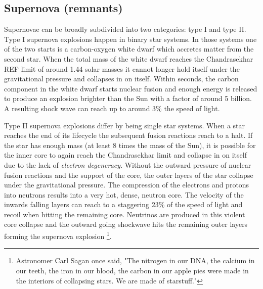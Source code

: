 \subsection{Supernova (remnants)}
Supernovae can be broadly subdivided into two categories: type I and type II. Type I supernova explosions happen in binary star systems. In those systems one of the two starts is a carbon-oxygen white dwarf which accretes matter from the second star. When the total mass of the white dwarf reaches the Chandrasekhar REF limit of around 1.44 solar masses it cannot longer hold itself under the gravitational pressure and collapses in on itself. Within seconds, the carbon component in the white dwarf starts nuclear fusion and enough energy is released to produce an explosion brighter than the Sun with a factor of around 5 billion. 
A resulting shock wave can reach up to around 3\% the speed of light.

Type II supernova explosions differ by being single star systems. When a star reaches the end of its lifecycle the subsequent fusion reactions reach to a halt. If the star has enough mass (at least 8 times the mass of the Sun), it is possible for the inner core to again reach the Chandrasekhar limit and collapse in on itself due to the lack of \textit{electron degeneracy}. Without the outward pressure of nuclear fusion reactions and the support of the core, the outer layers of the star collapse under the gravitational pressure. The compression of the electrons and protons into neutrons results into a very hot, dense, neutron core. The velocity of the inwards falling layers can reach to a staggering 23\% of the speed of light and recoil when hitting the remaining core. Neutrinos are produced in this violent core collapse and the outward going shockwave hits the remaining outer layers forming the supernova explosion \footnote{Astronomer Carl Sagan once said, "The nitrogen in our DNA, the calcium in our teeth, the iron in our blood, the carbon in our apple pies were made in the interiors of collapsing stars. We are made of starstuff."}.

